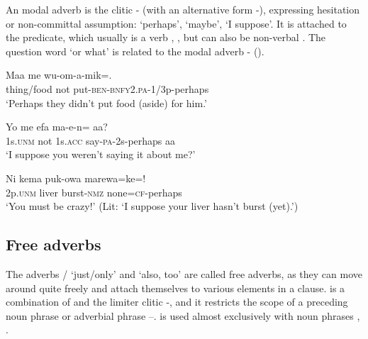 An  modal adverb is the clitic - (with an alternative form -), expressing hesitation or non-committal assumption: `perhaps', `maybe', `I suppose'. It is attached to the predicate, which usually is a verb  ,  , but can also be non-verbal . The question word  `or what' is related to the modal adverb - ().

\ea%
\label{ex:3:x517}
\gll Maa me wu-om-a-mik=. \\
thing/food not put-\textsc{ben}-\textsc{bnfy}2.\textsc{pa}-1/3p-perhaps\\
\glt`Perhaps they didn't put food (aside) for him.'
\z

\ea%
\label{ex:3:x518}
\gll Yo me efa ma-e-n= aa? \\
1s.\textsc{unm} not 1s.\textsc{acc} say-\textsc{pa}-2s-perhaps aa\\
\glt`I suppose you weren't saying it about me?'
\z

\ea%
\label{ex:3:x519}
\gll Ni kema puk-owa marewa=ke=! \\
2p.\textsc{unm} liver burst-\textsc{nmz} none=\textsc{cf}-perhaps\\
\glt`You must be crazy!' (Lit: `I suppose your liver hasn't burst (yet).')
\z

\subsection{Free adverbs}\label{sec:3.9.4}
{}
The adverbs \textstyleStyleVernacularWordsItalic{)}/ `just/only' and  `also, too' are called free adverbs, as they can move around quite freely and attach themselves to various elements in a clause.  is a combination of  and the limiter clitic \nobreakdash-, and it restricts the scope of a preceding noun phrase or adverbial phrase --.  is used almost exclusively with noun phrases , .

